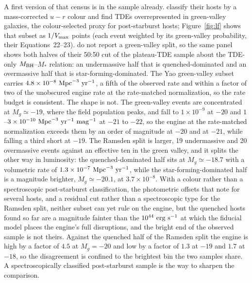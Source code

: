 \documentclass[twocolumn,pdftex]{aastex701}
\begin{document}
A first version of that census is in the sample already. \citet{Yao:2023a} classify their hosts by a mass-corrected $u-r$ colour and find TDEs overrepresented in green-valley galaxies, the colour-selected proxy for post-starburst hosts; Figure~\ref{fig:lf} shows that subset as $1/V_{\rm max}$ points (each event weighted by its green-valley probability, their Equations~22--23). \citet{Ramsden:2026a} do not report a green-valley split, so the same panel shows both halves of their 50:50 cut of the \citet{Ramsden:2025a} plateau-TDE sample about the TDE-only $M_{\rm BH}$--$M_{\ast}$ relation: an undermassive half that is quenched-dominated and an overmassive half that is star-forming-dominated. The Yao green-valley subset carries $4.8 \times 10^{-8}~{\rm Mpc}^{-3}~{\rm yr}^{-1}$, a fifth of the observed rate and within a factor of two of the unobscured engine rate at the rate-matched normalization, so the rate budget is consistent. The shape is not. The green-valley events are concentrated at $M_g \simeq -19$, where the field population peaks, and fall to $1 \times 10^{-9}$ at $-20$ and $1$--$3 \times 10^{-10}~{\rm Mpc}^{-3}~{\rm yr}^{-1}~{\rm mag}^{-1}$ at $-21$ to $-22$, so the engine at the rate-matched normalization exceeds them by an order of magnitude at $-20$ and at $-21$, while falling a third short at $-19$. The Ramsden split is larger, 19 undermassive and 20 overmassive events against an effective ten in the green valley, and it splits the other way in luminosity: the quenched-dominated half sits at $M_g \simeq -18.7$ with a volumetric rate of $1.3 \times 10^{-7}~{\rm Mpc}^{-3}~{\rm yr}^{-1}$, while the star-forming-dominated half is a magnitude brighter, $M_g \simeq -20.1$, at $3.7 \times 10^{-8}$. With a colour rather than a spectroscopic post-starburst classification, the photometric offsets that \citet{Yao:2023a} note for several hosts, and a residual cut rather than a spectroscopic type for the Ramsden split, neither subset can yet rule on the engine, but the quenched hosts found so far are a magnitude fainter than the $10^{44}~{\rm erg~s^{-1}}$ at which the fiducial model places the engine's full disruptions, and the bright end of the observed sample is not theirs. Against the quenched half of the Ramsden split the engine is high by a factor of $4.5$ at $M_g = -20$ and low by a factor of $1.3$ at $-19$ and $1.7$ at $-18$, so the disagreement is confined to the brightest bin the two samples share. A spectroscopically classified post-starburst sample is the way to sharpen the comparison.
\end{document}
